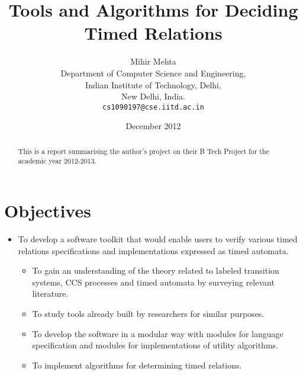 \documentclass{article}
\begin{document}
\title{Tools and Algorithms for Deciding Timed Relations}

\author{Mihir Mehta\\
Department of Computer Science and Engineering,\\
Indian Institute of Technology, Delhi,\\
New Delhi, India.\\
\texttt{cs1090197@cse.iitd.ac.in}
}

\date{December 2012}

\maketitle

\begin{abstract}
This is a report summarising the author's project on their B Tech
Project for the academic year 2012-2013.
\end{abstract}

\section{Objectives}

\begin{itemize}

\item To develop a software toolkit that would enable users to verify
  various timed relations specifications and implementations expressed
  as timed automata.

  \begin{itemize}

  \item To gain an understanding of the theory related to labeled
    transition systems, CCS processes and timed automata by surveying
    relevant literature.

  \item To study tools already built by researchers for similar purposes.

  \item To develop the software in a modular way with modules for
    language specification and modules for implementations of utility
    algorithms.

  \item To implement algorithms for determining timed relations.

  \end{itemize}

\end{itemize}
\end{document}
